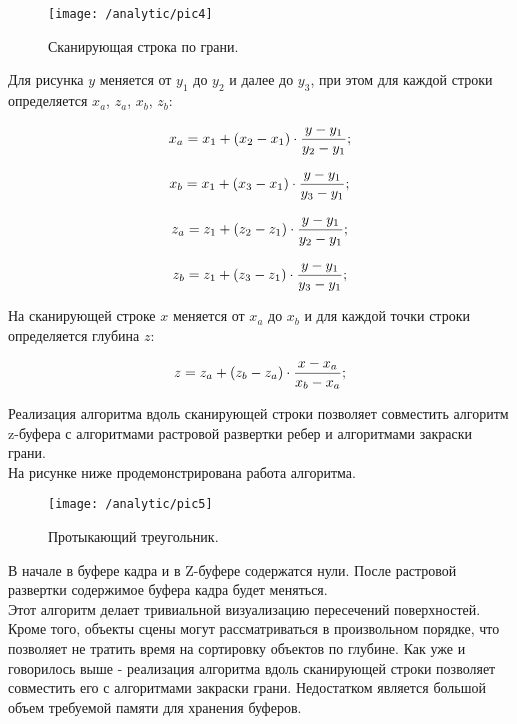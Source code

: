 \begin{figure}[H]
\center
\texttt{[image: /analytic/pic4]}
\caption{Сканирующая строка по грани.}
\end{figure}

Для рисунка $y$ меняется от $y_{1}$ до $y_{2}$ и далее до $y_{3}$, при этом для каждой строки определяется $x_{a}$, $z_{a}$, $x_{b}$, $z_{b}$:

\begin{equation}
	x_{a} = x_{1} + (x_{2} - x_{1}) \cdot \frac{y - y_{1}}{y_{2} - y_{1}}; \notag
\end{equation}

\begin{equation}
	x_{b} = x_{1} + (x_{3} - x_{1}) \cdot \frac{y - y_{1}}{y_{3} - y_{1}}; \notag
\end{equation}

\begin{equation}
	z_{a} = z_{1} + (z_{2} - z_{1}) \cdot \frac{y - y_{1}}{y_{2} - y_{1}}; \notag
\end{equation}

\begin{equation}
	z_{b} = z_{1} + (z_{3} - z_{1}) \cdot \frac{y - y_{1}}{y_{3} - y_{1}}; \notag
\end{equation}

На сканирующей строке $x$ меняется от $x_{a}$ до $x_{b}$ и для каждой точки строки определяется глубина $z$:

\begin{equation}
	z = z_{a} + (z_{b} - z_{a}) \cdot \frac{x - x_{a}}{x_{b} - x_{a}}; \notag
\end{equation}

Реализация алгоритма вдоль сканирующей строки позволяет совместить алгоритм z-буфера с алгоритмами растровой развертки ребер и алгоритмами закраски грани.\\

На рисунке ниже продемонстрирована работа алгоритма.

\begin{figure}[H]
\center
\texttt{[image: /analytic/pic5]}
\caption{Протыкающий треугольник.}
\end{figure}

В начале в буфере кадра и в Z-буфере содержатся нули. После растровой развертки содержимое буфера кадра будет меняться.\\

Этот алгоритм делает тривиальной визуализацию пересечений поверхностей. Кроме того, объекты сцены могут рассматриваться в произвольном порядке, что позволяет не тратить время на сортировку объектов по глубине. Как уже и говорилось выше - реализация алгоритма вдоль сканирующей строки позволяет совместить его с алгоритмами закраски грани. Недостатком является большой объем требуемой памяти для хранения буферов.

